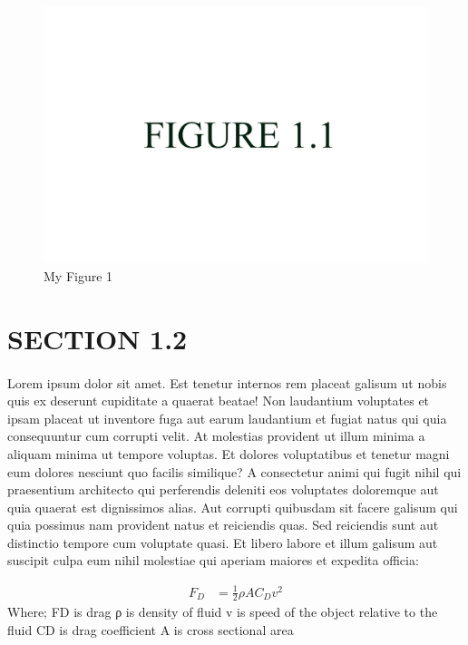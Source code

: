\documentclass[a4paper,12pt]{report}
\begin{document}
\begin{figure}[h]
        \centering
        \includegraphics[width=12cm]{fig_1.jpg}
        \caption{My Figure 1}
        \label{fig:my_label}
\end{figure}

\section{SECTION 1.2}
\paragraph{}
\par Lorem ipsum dolor sit amet. Est tenetur internos rem placeat galisum ut nobis quis ex deserunt cupiditate a quaerat beatae! Non laudantium voluptates et ipsam placeat ut inventore fuga aut earum laudantium et fugiat natus qui quia consequuntur cum corrupti velit. At molestias provident ut illum minima a aliquam minima ut tempore voluptas. Et dolores voluptatibus et tenetur magni eum dolores nesciunt quo facilis similique? A consectetur animi qui fugit nihil qui praesentium architecto qui perferendis deleniti eos voluptates doloremque aut quia quaerat est dignissimos alias. Aut corrupti quibusdam sit facere galisum qui quia possimus nam provident natus et reiciendis quas. Sed reiciendis sunt aut distinctio tempore cum voluptate quasi. Et libero labore et illum galisum aut suscipit culpa eum nihil molestiae qui aperiam maiores et expedita officia:

\begin{equation}
\begin{split}
F_D & = \frac{1}{2}\rho A C_D v^2 
 \end{split}
\end{equation}
Where; \hfill \break
FD is drag \hfill \break
ρ is density of fluid \hfill \break
v is speed of the object relative to the fluid \hfill \break
CD is drag coefficient \hfill \break
A is cross sectional area 
\end{document}
